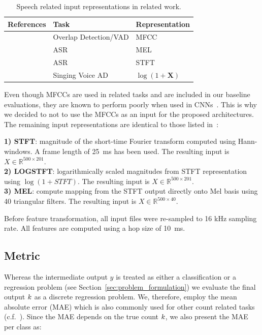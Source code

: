 \begin{table}
  \centering
  \scriptsize
\begin{tabular}{rll}
\toprule
References & Task & Representation \\
\midrule
\cite{geiger13, hagerer17} & Overlap Detection/VAD & MFCC \\
\cite{Graves13, sainath15, marchi17} & ASR & MEL \\
\cite{amodei16} & ASR & STFT \\
\cite{schluter15, schluter16} & Singing Voice AD & \(\log(1 + \mathbf{X})\) \\
\bottomrule
\end{tabular}
\caption{Speech related input representations in related work.}
\label{tab:inputrep}
\end{table}

Even though MFCCs are used in related tasks and are included in our baseline evaluations, they are known to perform poorly when used in CNNs~\cite{Seltzer13}.
This is why we decided to not to use the MFCCs as an input for the proposed architectures.
The remaining input representations are identical to those listed in~\cite{stoeter17}:

\noindent\textbf{1) STFT}: magnitude of the short-time Fourier transform computed using Hann-windows.
A frame length of 25~ms has been used.
The resulting input is \(X \in \mathbb{R}^{500 \times 201}\).\\
\textbf{2) LOGSTFT}: logarithmically scaled magnitudes from STFT representation using \(\log(1 + STFT)\).
The resulting input is \(X \in \mathbb{R}^{500 \times 201}\).\\
\textbf{3) MEL}: compute mapping from the STFT output directly onto Mel basis using 40 triangular filters.
The resulting input is \(X \in \mathbb{R}^{500 \times 40}\).
\par
Before feature transformation, all input files were re-sampled to 16 kHz sampling rate. All features are computed using a hop size of 10~ms.

\subsection{Metric}%
\label{ssec:metrics}

Whereas the intermediate output \(y\) is treated as either a classification or a regression problem (see Section~\ref{sec:problem_formulation}) we evaluate the final output \(k \) as a discrete regression problem.
We, therefore, employ the mean absolute error (MAE) which is also commonly used for other count related tasks (c.f.~\cite{zhang15, Rezatofigh16}).
Since the MAE depends on the true count \(k \), we also present the MAE per class as:

